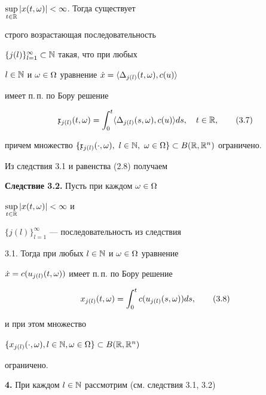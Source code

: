 $\sup\limits_{t\in\Bbb R}|x(t,\omega)|<\infty$. Тогда существует


строго возрастающая последовательность


$\{j(l)\}_{l=1}^{\infty}\subset \Bbb N$ такая, что при любых


$l\in \Bbb N$ и $\omega\in\Omega$ уравнение $\Dot x=\langle \Delta_{j(l)}(t,\omega),c(u)\rangle$


имеет п.\,п. по Бору решение


\begin{equation}


\frak x_{j(l)}\tm=\int_0^t \la \Delta_{j(l)}(s,\omega),c(u)\ra ds,\quad


t\in \Bbb R,\tag{3.7}


\end{equation}


причем множество $\{\frak x_{j(l)}(\cdot,\omega),\ l\in\Bbb N,\ \mm\}\subset


B(\Bbb R,\Bbb R^n)$ ограничено.


\medskip





Из следствия 3.1 и равенства (2.8) получаем


\medskip





{\bf Следствие 3.2.} Пусть при каждом $\omega\in\Omega$\;


$\sup\limits_{t\in\Bbb R}|x(t,\omega)|<\infty$ и


$\{j(l)\}_{l=1}^{\infty}$ --- последовательность из следствия


3.1. Тогда при любых $l\in\Bbb N$ и $\omega\in\Omega$ уравнение


$\Dot x =c(u_{j(l)}(t,\omega))$ имеет п.\,п. по Бору решение


\begin{equation}


x_{j(l)}\tm=\int_0^t c(u_{j(l)}(s,\omega))ds, \tag{3.8}


\end{equation}


и при этом множество


$\{x_{j(l)}(\cdot,\omega), l\in \Bbb N, \omega\in\Omega\}\subset B(\Bbb R,\Bbb R^n)$


ограничено.


\medskip





{\bf 4.} При каждом $l\in\Bbb N$ рассмотрим (см. следствия 3.1, 3.2)


